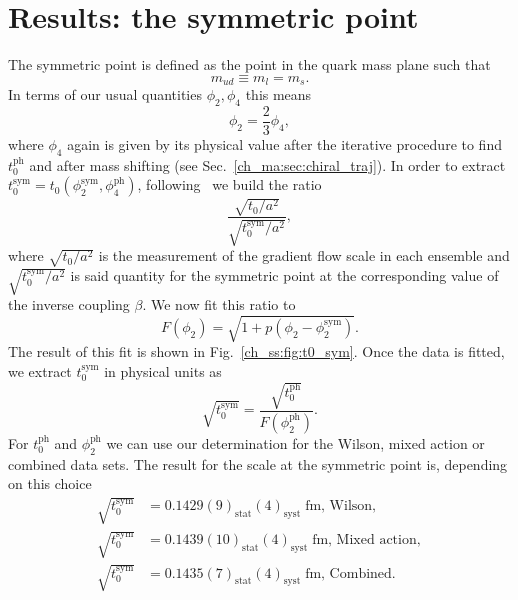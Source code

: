\section{Results: the symmetric point}

The symmetric point is defined as the point in the quark mass plane such that
\begin{equation}
m_{ud}\equiv m_l=m_s.
\end{equation}
In terms of our usual quantities $\phi_2,\phi_4$ this means
\begin{equation}
\phi_2=\frac{2}{3}\phi_4,
\end{equation}
where $\phi_4$ again is given by its physical value after the iterative procedure to find $t_0^{\textrm{ph}}$ and after mass shifting (see Sec.~\ref{ch_ma:sec:chiral_traj}). In order to extract $t_0^{\textrm{sym}}=t_0(\phi_2^{\textrm{sym}},\phi_4^{\textrm{ph}})$, following~\citep{Strassberger:2023xnj} we build the ratio
\begin{equation}
\frac{\sqrt{t_0/a^2}}{\sqrt{t_0^{\textrm{sym}}/a^2}},
\end{equation}
where $\sqrt{t_0/a^2}$ is the measurement of the gradient flow scale in each ensemble and $\sqrt{t_0^{\textrm{sym}}/a^2}$ is said quantity for the symmetric point at the corresponding value of the inverse coupling $\beta$. We now fit this ratio to
\begin{equation}
\label{ch_ss:eq:fit_t0_sym}
F(\phi_2)=\sqrt{1+p(\phi_2-\phi_2^{\textrm{sym}})}.
\end{equation}
The result of this fit is shown in Fig.~\ref{ch_ss:fig:t0_sym}. Once the data is fitted, we extract $t_0^{\textrm{sym}}$ in physical units as
\begin{equation}
\sqrt{t_0^{\textrm{sym}}}=\frac{\sqrt{t_0^{\textrm{ph}}}}{F(\phi_2^{\textrm{ph}})}.
\end{equation}
For $t_0^{\textrm{ph}}$ and $\phi_2^{\textrm{ph}}$ we can use our determination for the Wilson, mixed action or combined data sets. The result for the scale at the symmetric point is, depending on this choice
\begin{align}
\label{ch_ss:eq:t0_sym}
\sqrt{t_0^{\textrm{sym}}}&=0.1429(9)_{\textrm{stat}}(4)_{\textrm{syst}}\;\textrm{fm, Wilson}, \\
\sqrt{t_0^{\textrm{sym}}}&=0.1439(10)_{\textrm{stat}}(4)_{\textrm{syst}}\;\textrm{fm, Mixed action}, \\
\sqrt{t_0^{\textrm{sym}}}&=0.1435(7)_{\textrm{stat}}(4)_{\textrm{syst}}\;\textrm{fm, Combined}.
\end{align}

